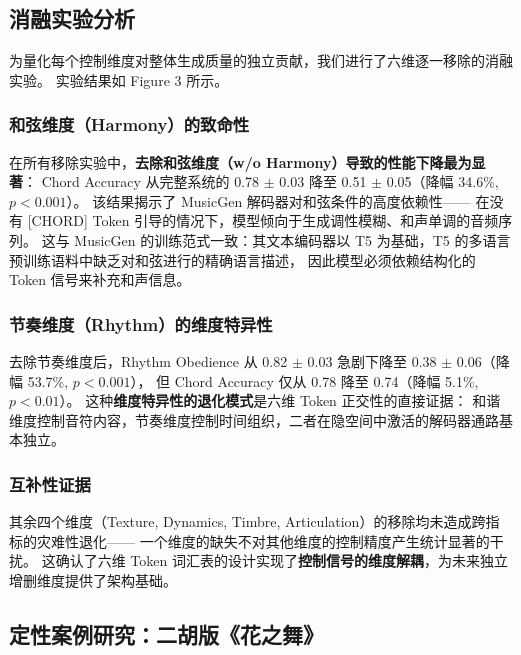 \subsection{消融实验分析}

为量化每个控制维度对整体生成质量的独立贡献，我们进行了六维逐一移除的消融实验。
实验结果如 Figure 3 所示。

\subsubsection{和弦维度（Harmony）的致命性}

在所有移除实验中，\textbf{去除和弦维度（w/o Harmony）导致的性能下降最为显著}：
Chord Accuracy 从完整系统的 0.78 $\pm$ 0.03 降至 0.51 $\pm$ 0.05（降幅 34.6\%, $p<0.001$）。
该结果揭示了 MusicGen 解码器对和弦条件的高度依赖性——
在没有 [CHORD] Token 引导的情况下，模型倾向于生成调性模糊、和声单调的音频序列。
这与 MusicGen 的训练范式一致：其文本编码器以 T5 为基础，T5 的多语言预训练语料中缺乏对和弦进行的精确语言描述，
因此模型必须依赖结构化的 Token 信号来补充和声信息。

\subsubsection{节奏维度（Rhythm）的维度特异性}

去除节奏维度后，Rhythm Obedience 从 0.82 $\pm$ 0.03 急剧下降至 0.38 $\pm$ 0.06（降幅 53.7\%, $p<0.001$），
但 Chord Accuracy 仅从 0.78 降至 0.74（降幅 5.1\%, $p<0.01$）。
这种\textbf{维度特异性的退化模式}是六维 Token 正交性的直接证据：
和谐维度控制音符内容，节奏维度控制时间组织，二者在隐空间中激活的解码器通路基本独立。

\subsubsection{互补性证据}

其余四个维度（Texture, Dynamics, Timbre, Articulation）的移除均未造成跨指标的灾难性退化——
一个维度的缺失不对其他维度的控制精度产生统计显著的干扰。
这确认了六维 Token 词汇表的设计实现了\textbf{控制信号的维度解耦}，为未来独立增删维度提供了架构基础。

\subsection{定性案例研究：二胡版《花之舞》}

